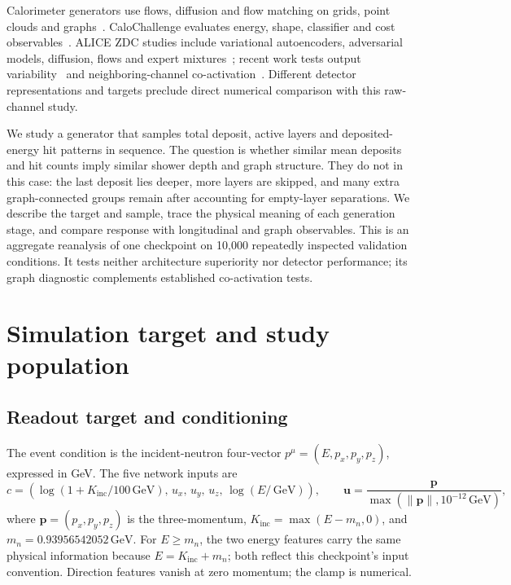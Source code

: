 \documentclass[10pt]{article}
\newcommand{\GeV}{\,\mathrm{GeV}}
\newcommand{\Kinc}{K_{\mathrm{inc}}}
\begin{document}
Calorimeter generators use flows, diffusion and flow matching on grids, point clouds and graphs~\cite{caloflow,calodiffusion,calograph,caloclouds2,calodream}. CaloChallenge evaluates energy, shape, classifier and cost observables~\cite{calochallenge,kansalmetrics}. ALICE ZDC studies include variational autoencoders, adversarial models, diffusion, flows and expert mixtures~\cite{dubinskizdc,kitazdc,fasterzdc,expertsim,wojnar2025}; recent work tests output variability~\cite{majerziaf} and neighboring-channel co-activation~\cite{majerz2026}. Different detector representations and targets preclude direct numerical comparison with this raw-channel study.

We study a generator that samples total deposit, active layers and deposited-energy hit patterns in sequence. The question is whether similar mean deposits and hit counts imply similar shower depth and graph structure. They do not in this case: the last deposit lies deeper, more layers are skipped, and many extra graph-connected groups remain after accounting for empty-layer separations. We describe the target and sample, trace the physical meaning of each generation stage, and compare response with longitudinal and graph observables. This is an aggregate reanalysis of one checkpoint on 10,000 repeatedly inspected validation conditions. It tests neither architecture superiority nor detector performance; its graph diagnostic complements established co-activation tests.

\section{Simulation target and study population}
\label{sec:data}

\subsection{Readout target and conditioning}

The event condition is the incident-neutron four-vector $p^\mu=(E,p_x,p_y,p_z)$, expressed in GeV. The five network inputs are
\begin{equation}
 c=\left(\log(1+\Kinc/100\GeV),\,u_x,\,u_y,\,u_z,\,\log(E/\GeV)\right),
 \qquad \mathbf u=\frac{\mathbf p}{\max(\lVert\mathbf p\rVert,10^{-12}\GeV)},
 \label{eq:condition}
\end{equation}
where $\mathbf p=(p_x,p_y,p_z)$ is the three-momentum, $\Kinc=\max(E-m_n,0)$, and $m_n=0.93956542052\GeV$. For $E\geq m_n$, the two energy features carry the same physical information because $E=\Kinc+m_n$; both reflect this checkpoint's input convention. Direction features vanish at zero momentum; the clamp is numerical.
\end{document}
